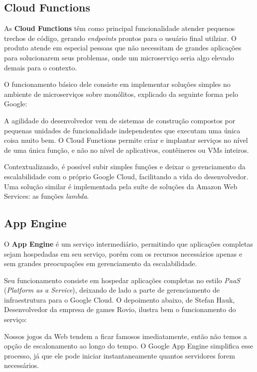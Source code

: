 \subsection{Cloud Functions}

As \textbf{Cloud Functions} têm como principal funcionalidade atender pequenos trechos de código, gerando \textit{endpoints} prontos para o usuário final utilziar. O produto atende em especial pessoas que não necessitam de grandes aplicações para solucionarem seus problemas, onde um microserviço seria algo elevado demais para o contexto.

O funcionamento básico dele consiste em implementar soluções simples no ambiente de microserviços sobre monólitos, explicado da seguinte forma pelo Google\cite{googlecloudfunctions}:

\begin{citacaoLonga}
  A agilidade do desenvolvedor vem de sistemas de construção compostos por pequenas unidades de funcionalidade independentes que executam uma única coisa muito bem. O Cloud Functions permite criar e implantar serviços no nível de uma única função, e não no nível de aplicativos, contêineres ou VMs inteiros.
\end{citacaoLonga}

Contextualizando, é possível subir simples funções e deixar o gerenciamento da escalabilidade com o próprio Google Cloud, facilitando a vida do desenvolvedor. Uma solução similar é implementada pela suíte de soluções da Amazon Web Services: as funções \textit{lambda}.

\subsection{App Engine}

O \textbf{App Engine} é um serviço intermediário, permitindo que aplicações completas sejam hospedadas em seu serviço, porém com os recursos necessários apenas e sem grandes preocupações em gerenciamento da escalabilidade.

Seu funcionamento consiste em hospedar aplicações completas no estilo \textit{PaaS} (\textit{Platform as a Service}), deixando de lado a parte de gerenciamento de infraestrutura para o Google Cloud. O depoimento abaixo, de Stefan Hauk,
Desenvolvedor da empresa de games Rovio, ilustra bem o funcionamento do serviço\cite{googlecloudappengine}:

\begin{citacaoLonga}
  Nossos jogos da Web tendem a ficar famosos imediatamente, então não temos a opção de escalonamento ao longo do tempo. O Google App Engine simplifica esse processo, já que ele pode iniciar instantaneamente quantos servidores forem necessários.
\end{citacaoLonga}

